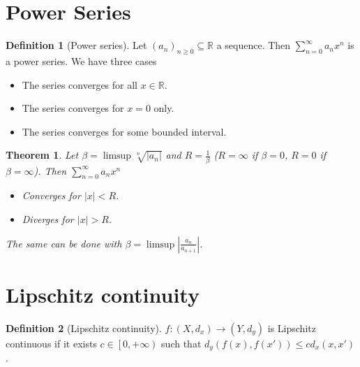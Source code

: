 \documentclass{article}
\newcommand{\DS}{\displaystyle}
\newcommand{\abs}[1]{\left|#1\right|}
\newcommand{\f}[3]{#1 : #2 \rightarrow #3}
\newcommand{\intco}[1]{\left[#1\right)}
\theoremstyle{definition}
\newtheorem{definition}{Definition}[section]
\theoremstyle{definition}
\theoremstyle{plain}
\newtheorem{theorem}{Theorem}[section]
\theoremstyle{plain}
\theoremstyle{plain}
\theoremstyle{plain}
\theoremstyle{definition}
\theoremstyle{remark}
\theoremstyle{remark}
\theoremstyle{remark}
\theoremstyle{remark}
\newcommand{\R}{\mathbb{R}}
\newcommand{\pseries}[1]{\sum_{n=0}^\infty #1}
\begin{document}
\section{Power Series}


\begin{definition}[Power series]
  Let $(a_n)_{n \geq 0} \subseteq \R$ a sequence. Then $\pseries{a_n x^n}$ is a power series. We have three cases
  \begin{itemize}
  \item The series converges for all $x \in \R$.
  \item The series converges for $x = 0$ only.
  \item The series converges for some bounded interval.
  \end{itemize}
\end{definition}


\begin{theorem}
  Let $\beta = \limsup \sqrt[n]{|a_n|}$ and $R = \frac{1}{\beta}$ ($R = \infty$ if $\beta = 0$, $R = 0$ if $\beta = \infty$). Then $\DS \pseries{a_n x^n}$
  \begin{itemize}
  \item Converges for $|x| < R$.
  \item Diverges for $|x| > R$.
  \end{itemize}
  The same can be done with $\beta = \limsup \abs{\frac{a_n}{a_{n+1}}}$.
\end{theorem}





\section{Lipschitz continuity}


\begin{definition}[Lipschitz continuity]
  $\f{f}{(X,d_x)}{(Y,d_y)}$ is Lipschitz continuous if it exists $c \in \intco{0,+\infty}$ such that $d_y(f(x),f(x')) \leq c d_x(x,x')$.
\end{definition}
\end{document}
